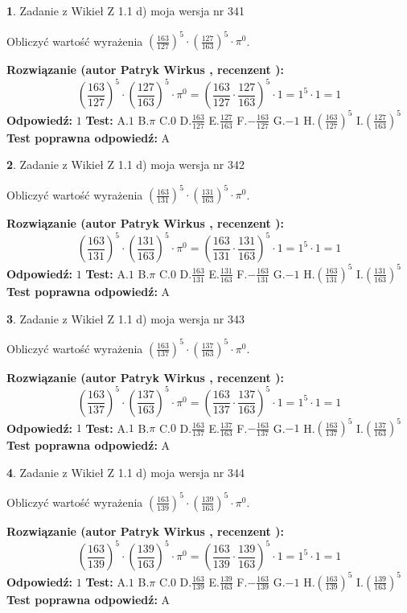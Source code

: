 \documentclass[12pt, a4paper]{article}
\theoremstyle{definition} %
\newtheorem{zad}{}
\newcommand{\zadStart}[1]{\begin{zad}#1\newline}
\newcommand{\zadStop}{\end{zad}}
\newcommand{\rozwStart}[2]{\noindent \textbf{Rozwiązanie (autor #1 , recenzent #2): }\newline}
\newcommand{\rozwStop}{\newline}
\newcommand{\odpStart}{\noindent \textbf{Odpowiedź:}\newline}
\newcommand{\odpStop}{\newline}
\newcommand{\testStart}{\noindent \textbf{Test:}\newline}
\newcommand{\testStop}{\newline}
\newcommand{\kluczStart}{\noindent \textbf{Test poprawna odpowiedź:}\newline}
\newcommand{\kluczStop}{\newline}
\begin{document}
\zadStart{Zadanie z Wikieł Z 1.1 d) moja wersja nr 341}

Obliczyć wartość wyrażenia $(\frac{163}{127})^{5} \cdot (\frac{127}{163})^{5} \cdot \pi^{0}$.
\zadStop
\rozwStart{Patryk Wirkus}{}
$$(\frac{163}{127})^{5} \cdot (\frac{127}{163})^{5} \cdot \pi^{0} = (\frac{163}{127} \cdot \frac{127}{163})^{5} \cdot 1 = 1^{5} \cdot 1 = 1$$
\rozwStop
\odpStart
$1$
\odpStop
\testStart
A.$1$ B.$\pi$ C.$0$ D.$\frac{163}{127}$ E.$\frac{127}{163}$
F.$-\frac{163}{127}$ G.$-1$
H.$(\frac{163}{127})^{5}$
I.$(\frac{127}{163})^{5}$
\testStop
\kluczStart
A
\kluczStop



\zadStart{Zadanie z Wikieł Z 1.1 d) moja wersja nr 342}

Obliczyć wartość wyrażenia $(\frac{163}{131})^{5} \cdot (\frac{131}{163})^{5} \cdot \pi^{0}$.
\zadStop
\rozwStart{Patryk Wirkus}{}
$$(\frac{163}{131})^{5} \cdot (\frac{131}{163})^{5} \cdot \pi^{0} = (\frac{163}{131} \cdot \frac{131}{163})^{5} \cdot 1 = 1^{5} \cdot 1 = 1$$
\rozwStop
\odpStart
$1$
\odpStop
\testStart
A.$1$ B.$\pi$ C.$0$ D.$\frac{163}{131}$ E.$\frac{131}{163}$
F.$-\frac{163}{131}$ G.$-1$
H.$(\frac{163}{131})^{5}$
I.$(\frac{131}{163})^{5}$
\testStop
\kluczStart
A
\kluczStop



\zadStart{Zadanie z Wikieł Z 1.1 d) moja wersja nr 343}

Obliczyć wartość wyrażenia $(\frac{163}{137})^{5} \cdot (\frac{137}{163})^{5} \cdot \pi^{0}$.
\zadStop
\rozwStart{Patryk Wirkus}{}
$$(\frac{163}{137})^{5} \cdot (\frac{137}{163})^{5} \cdot \pi^{0} = (\frac{163}{137} \cdot \frac{137}{163})^{5} \cdot 1 = 1^{5} \cdot 1 = 1$$
\rozwStop
\odpStart
$1$
\odpStop
\testStart
A.$1$ B.$\pi$ C.$0$ D.$\frac{163}{137}$ E.$\frac{137}{163}$
F.$-\frac{163}{137}$ G.$-1$
H.$(\frac{163}{137})^{5}$
I.$(\frac{137}{163})^{5}$
\testStop
\kluczStart
A
\kluczStop



\zadStart{Zadanie z Wikieł Z 1.1 d) moja wersja nr 344}

Obliczyć wartość wyrażenia $(\frac{163}{139})^{5} \cdot (\frac{139}{163})^{5} \cdot \pi^{0}$.
\zadStop
\rozwStart{Patryk Wirkus}{}
$$(\frac{163}{139})^{5} \cdot (\frac{139}{163})^{5} \cdot \pi^{0} = (\frac{163}{139} \cdot \frac{139}{163})^{5} \cdot 1 = 1^{5} \cdot 1 = 1$$
\rozwStop
\odpStart
$1$
\odpStop
\testStart
A.$1$ B.$\pi$ C.$0$ D.$\frac{163}{139}$ E.$\frac{139}{163}$
F.$-\frac{163}{139}$ G.$-1$
H.$(\frac{163}{139})^{5}$
I.$(\frac{139}{163})^{5}$
\testStop
\kluczStart
A
\kluczStop
\end{document}
